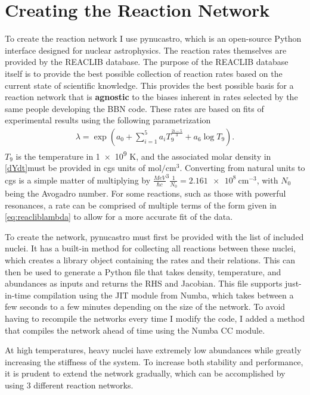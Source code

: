 \section{Creating the Reaction Network}
\label{sec:pna}
To create the reaction network I use pynucastro\cite{pynucastro2}, which is an open-source Python interface designed for nuclear astrophysics. The reaction rates themselves are provided by the REACLIB database\cite{REACLIB}. The purpose of the REACLIB database itself is to provide the best possible collection of reaction rates based on the current state of scientific knowledge. This provides the best possible basis for a reaction network that is \textbf{agnostic} to the biases inherent in rates selected by the same people developing the BBN code. These rates are based on fits of experimental results using the following parametrization 
\begin{align}
    \lambda = \exp\left(a_0+\sum_{i=1}^{5}a_i T_9^{\frac{2i-5}{3}}+a_6 \log{T_9}\right).
    \label{eq:reacliblambda}
\end{align}
$T_9$ is the temperature in \num{1e9} K, and the associated molar density in \cref{dYdt}must be provided in cgs units of $\text{mol}/\text{cm}^3$. Converting from natural units to cgs is a simple matter of multiplying by $\frac{MeV}{\hbar c}^3\frac{1}{N_0}=\SI{2.161e8}{\cm^{-3}}$, with $N_0$ being the Avogadro number. For some reactions, such as those with powerful resonances, a rate can be comprised of multiple terms of the form given in \cref{eq:reacliblambda} to allow for a more accurate fit of the data. 

To create the network, pynucastro must first be provided with the list of included nuclei. It has a built-in method for collecting all reactions between these nuclei, which creates a library object containing the rates and their relations. This can then be used to generate a Python file that takes density, temperature, and abundances as inputs and returns the RHS and Jacobian. This file supports just-in-time compilation using the JIT module from Numba, which takes between a few seconds to a few minutes depending on the size of the network. To avoid having to recompile the networks every time I modify the code, I added a method that compiles the network ahead of time using the Numba CC module. 

At high temperatures, heavy nuclei have extremely low abundances while greatly increasing the stiffness of the system. To increase both stability and performance, it is prudent to extend the network gradually, which can be accomplished by using 3 different reaction networks. 

